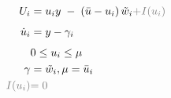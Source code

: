 \documentclass[10pt]{article}
\begin{document}
\begin{align*}
U_i &= u_i y \;-\;(\bar{u}-u_i)\,\tilde{w}_i \textcolor{gray}{ + I(u_i)} \\[4pt] 
 \dot{u}_i &= y - \gamma_i   \\[4pt]
& 0 \le u_i \le \mu  \\
\gamma &= \tilde{w}_i, \mu =\bar{u}_i \\ 
\textcolor{gray}{I(u_i)}&\textcolor{gray}{=0}\end{align*}
\end{document}
